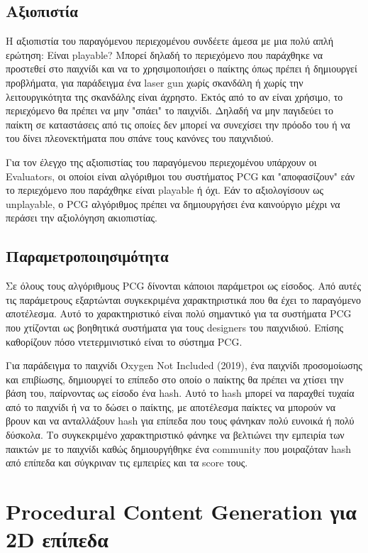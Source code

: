 \subsection{Aξιοπιστία} H αξιοπιστία του παραγόμενου περιεχομένου συνδέετε άμεσα με μια πολύ απλή ερώτηση: Είναι playable? Μπορεί δηλαδή το περιεχόμενο που παράχθηκε να προστεθεί στο παιχνίδι και να το χρησιμοποιήσει ο παίκτης όπως πρέπει ή δημιουργεί προβλήματα, για παράδειγμα ένα laser gun χωρίς σκανδάλη ή χωρίς την λειτουργικότητα της σκανδάλης είναι άχρηστο. Εκτός από το αν είναι χρήσιμο, το περιεχόμενο θα πρέπει να μην "σπάει" το παιχνίδι. Δηλαδή να μην παγιδεύει το παίκτη σε καταστάσεις από τις οποίες δεν μπορεί να συνεχίσει την πρόοδο του ή να του δίνει πλεονεκτήματα που σπάνε τους κανόνες του παιχνιδιού.
\par
Για τον έλεγχο της αξιοπιστίας του παραγόμενου περιεχομένου υπάρχουν οι Evaluators, οι οποίοι είναι αλγόριθμοι του συστήματος PCG και "αποφασίζουν" εάν το περιεχόμενο που παράχθηκε είναι playable ή όχι. Εάν το αξιολογίσουν ως unplayable, ο PCG αλγόριθμος πρέπει να δημιουργήσει ένα καινούργιο μέχρι να περάσει την αξιολόγηση ακιοπιστίας.

\subsection{Παραμετροποιησιμότητα} Σε όλους τους αλγόριθμους PCG δίνονται κάποιοι παράμετροι ως είσοδος. Από αυτές τις παράμετρους εξαρτώνται συγκεκριμένα χαρακτηριστικά που θα έχει το παραγόμενο αποτέλεσμα. Αυτό το χαρακτηριστικό είναι πολύ σημαντικό για τα συστήματα PCG που χτίζονται ως βοηθητικά συστήματα για τους designers του παιχνιδιού. Επίσης καθορίζουν πόσο ντετερμινιστικό είναι το σύστημα PCG.
\par
Για παράδειγμα το παιχνίδι Oxygen Not Included (2019), ένα παιχνίδι προσομοίωσης και επιβίωσης, δημιουργεί το επίπεδο στο οποίο ο παίκτης θα πρέπει να χτίσει την βάση του, παίρνοντας ως είσοδο ένα hash. Αυτό το hash μπορεί να παραχθεί τυχαία από το παιχνίδι ή να το δώσει ο παίκτης, με αποτέλεσμα παίκτες να μπορούν να βρουν και να ανταλλάξουν hash για επίπεδα που τους φάνηκαν πολύ ευνοικά ή πολύ δύσκολα. Το συγκεκριμένο χαρακτηριστικό φάνηκε να βελτιώνει την εμπειρία των παικτών με το παιχνίδι καθώς δημιουργήθηκε ένα community που μοιραζόταν hash από επίπεδα και σύγκριναν τις εμπειρίες και τα score τους.

\vspace{60mm}

\section{Procedural Content Generation για 2D επίπεδα}

